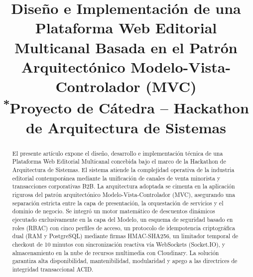 \documentclass[conference]{IEEEtran}
\begin{document}
\title{Diseño e Implementación de una Plataforma Web Editorial Multicanal Basada en el Patrón Arquitectónico Modelo-Vista-Controlador (MVC)\\
{\footnotesize \textsuperscript{*}Proyecto de Cátedra -- Hackathon de Arquitectura de Sistemas}}

\author{
    \and
    \and
}

\maketitle

\begin{abstract}
El presente artículo expone el diseño, desarrollo e implementación técnica de una Plataforma Web Editorial Multicanal concebida bajo el marco de la Hackathon de Arquitectura de Sistemas. El sistema atiende la complejidad operativa de la industria editorial contemporánea mediante la unificación de canales de venta minorista y transacciones corporativas B2B. La arquitectura adoptada se cimenta en la aplicación rigurosa del patrón arquitectónico Modelo-Vista-Controlador (MVC), asegurando una separación estricta entre la capa de presentación, la orquestación de servicios y el dominio de negocio. Se integró un motor matemático de descuentos dinámicos ejecutado exclusivamente en la capa del Modelo, un esquema de seguridad basado en roles (RBAC) con cinco perfiles de acceso, un protocolo de idempotencia criptográfica dual (RAM y PostgreSQL) mediante firmas HMAC-SHA256, un limitador temporal de checkout de 10 minutos con sincronización reactiva vía WebSockets (Socket.IO), y almacenamiento en la nube de recursos multimedia con Cloudinary. La solución garantiza alta disponibilidad, mantenibilidad, modularidad y apego a las directrices de integridad transaccional ACID.
\end{abstract}
\end{document}
